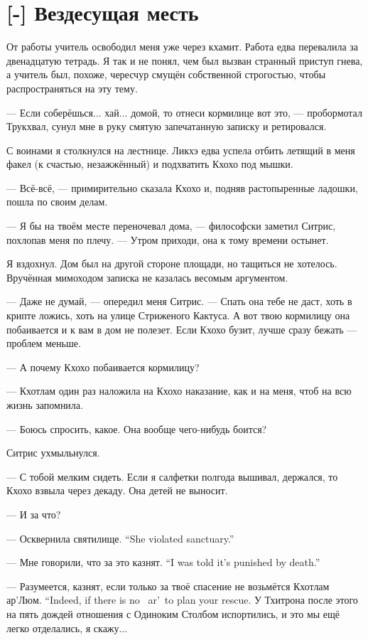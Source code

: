 \section{[-] Вездесущая месть}

От работы учитель освободил меня уже через кхамит.
Работа едва перевалила за двенадцатую тетрадь.
Я так и не понял, чем был вызван странный приступ гнева, а учитель был, похоже, чересчур смущён собственной строгостью, чтобы распространяться на эту тему.

--- Если соберёшься... хай... домой, то отнеси кормилице вот это, --- пробормотал Трукхвал, сунул мне в руку смятую запечатанную записку и ретировался.

С воинами я столкнулся на лестнице.
Ликхэ едва успела отбить летящий в меня факел (к счастью, незажжённый) и подхватить Кхохо под мышки.

--- Всё-всё, --- примирительно сказала Кхохо и, подняв растопыренные ладошки, пошла по своим делам.

--- Я бы на твоём месте переночевал дома, --- философски заметил Ситрис, похлопав меня по плечу.
--- Утром приходи, она к тому времени остынет.

Я вздохнул.
Дом был на другой стороне площади, но тащиться не хотелось.
Вручённая мимоходом записка не казалась весомым аргументом.

--- Даже не думай, --- опередил меня Ситрис.
--- Спать она тебе не даст, хоть в крипте ложись, хоть на улице Стриженого Кактуса.
А вот твою кормилицу она побаивается и к вам в дом не полезет.
Если Кхохо бузит, лучше сразу бежать --- проблем меньше.

--- А почему Кхохо побаивается кормилицу?

--- Кхотлам один раз наложила на Кхохо наказание, как и на меня, чтоб на всю жизнь запомнила.

--- Боюсь спросить, какое.
Она вообще чего-нибудь боится?

Ситрис ухмыльнулся.

--- С тобой мелким сидеть.
Если я салфетки полгода вышивал, держался, то Кхохо взвыла через декаду.
Она детей не выносит.

--- И за что?

{--- Осквернила святилище.}
{``She violated sanctuary.''}

{--- Мне говорили, что за это казнят.}
{``I was told it's punished by death.''}

{--- Разумеется, казнят, если только за твоё спасение не возьмётся Кхотлам ар'Люм.}
{``Indeed, if there is no \Kchotlam\ ar'\Loem\ to plan your rescue.}
У Тхитрона после этого на пять дождей отношения с Одиноким Столбом испортились, и это мы ещё легко отделались, я скажу...


